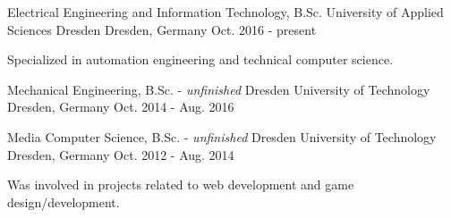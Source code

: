 

\begin{cventries}

\cventry
    {Electrical Engineering and Information Technology, B.Sc.}
    {University of Applied Sciences Dresden}
    {Dresden, Germany}
    {Oct. 2016 - present}
    {
    	\begin{cvitems}
    		\item {Specialized in automation engineering and technical computer science.}
    	\end{cvitems}
    }
    
\cventry
	{Mechanical Engineering, B.Sc. - \emph{unfinished}}
	{Dresden University of Technology}
	{Dresden, Germany}
	{Oct. 2014 - Aug. 2016}
	{}
	
\cventry
	{Media Computer Science, B.Sc. - \emph{unfinished}}
	{Dresden University of Technology}
	{Dresden, Germany}
	{Oct. 2012 - Aug. 2014}
	{
		\begin{cvitems}
			\item {Was involved in projects related to web development and game design/development.}
		\end{cvitems}
	}

  

\end{cventries}
